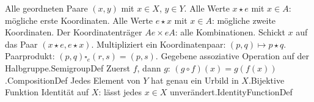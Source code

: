 \NewDocumentCommand{}
\NewDocumentCommand{}
\NewDocumentCommand{}
\newcommand\CRK{\CROrd{coordinates-carrier}{\mathcal K_e}}
\newcommand\CRChi{\CROrd{coordinates-map}{\chi_e}}
\newcommand\CRMu{\CROrd{coordinates-multiply}{\mu_e}}
\newcommand\CRLeft{\CROrd{coordinates-left}{Ae}}
\newcommand\CRRight{\CROrd{coordinates-right}{eA}}
\newcommand\CRSquare{\CRBin{coordinates-product}{\square_e}}
\newcommand\CRStar{\CRBin{coordinates-star}{\star}}
\newcommand\CRTimes{\CRBin{coordinates-cartesian}{\times}}
\newcommand\CRComp{\CRBin{coordinates-composition}{\circ}}
\newcommand\CRBij{\CRRel{coordinates-bijection}{\bij}}
\newcommand\CRId[1]{\CROrd{coordinates-identity}{\Id_{#1}}}
\newcommand\CRProof[1]{%
  \href{_B31-coordinates-proofs.pdf\#coordinates.proof.#1}{Beweistabelle}}
\newcommand\CRStatement[3]{%
  \par\Needspace{5\baselineskip}\medskip\noindent
  \textbf{\FormulaRefAuto{#1}[#2]: #3.}\par\smallskip\noindent}

%
  {Alle geordneten Paare \((x,y)\) mit \(x\in X\), \(y\in Y\).}
%
  {Alle Werte \(x\star e\) mit \(x\in A\): mögliche erste Koordinaten.}
%
  {Alle Werte \(e\star x\) mit \(x\in A\): mögliche zweite Koordinaten.}
%
  {Der Koordinatenträger \(Ae\times eA\): alle Kombinationen.}
%
  {Schickt \(x\) auf das Paar \((x\star e,e\star x)\).}
%
  {Multipliziert ein Koordinatenpaar: \((p,q)\mapsto p\star q\).}
%
  {Paarprodukt: \((p,q)\square_e(r,s)=(p,s)\).}
%
  {Gegebene assoziative Operation auf der Halbgruppe.}{SemigroupDef}
%
  {Zuerst \(f\), dann \(g\): \((g\circ f)(x)=g(f(x))\).}{CompositionDef}
%
  {Jedes Element von \(Y\) hat genau ein Urbild in \(X\).}{Bijektive Funktion}
%
  {Identität auf \(X\): lässt jedes \(x\in X\) unverändert.}{IdentityFunctionDef}

